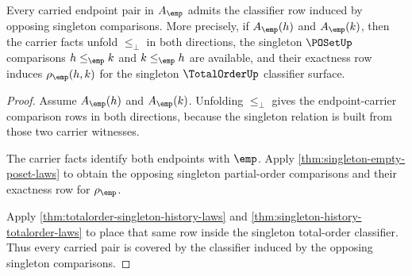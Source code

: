 \begin{theorem}
\label{thm:totalorder-singleton-classifier-coverage}
Every carried endpoint pair in $A_{\emp}$ admits the classifier row induced by
opposing singleton comparisons. More precisely, if $A_{\emp}(h)$ and
$A_{\emp}(k)$, then the carrier facts unfold $\le_{\bot}$ in both directions,
the singleton $\POSetUp$ comparisons $h\le_{\emp}k$ and $k\le_{\emp}h$ are
available, and their exactness row induces $\rho_{\emp}(h,k)$ for the
singleton $\TotalOrderUp$ classifier surface.
\end{theorem}
\begin{proof}
Assume $A_{\emp}(h)$ and $A_{\emp}(k)$. Unfolding $\le_{\bot}$ gives the
endpoint-carrier comparison rows in both directions, because the singleton
relation is built from those two carrier witnesses.

The carrier facts identify both endpoints with $\emp$. Apply
\autoref{thm:singleton-empty-poset-laws} to obtain the opposing singleton
partial-order comparisons and their exactness row for $\rho_{\emp}$.

Apply \autoref{thm:totalorder-singleton-history-laws} and
\autoref{thm:singleton-history-totalorder-laws} to place that same row inside
the singleton total-order classifier. Thus every carried pair is covered by
the classifier induced by the opposing singleton comparisons.
\end{proof}
